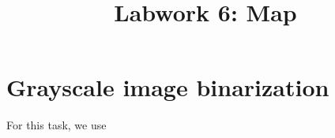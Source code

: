 \documentclass{article}
\title{Labwork 6: Map}
\begin{document}
\maketitle

\setlength\parindent{0pt}

\section{Grayscale image binarization }

For this task, we use
\end{document}
